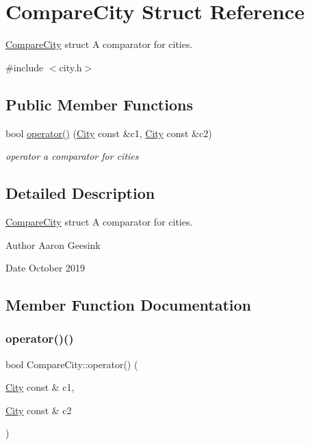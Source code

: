 \hypertarget{struct_compare_city}{}\section{Compare\+City Struct Reference}
\label{struct_compare_city}


\mbox{\hyperlink{struct_compare_city}{Compare\+City}} struct A comparator for cities.  




{\ttfamily \#include $<$city.\+h$>$}

\subsection*{Public Member Functions}
\begin{DoxyCompactItemize}
\item 
bool \mbox{\hyperlink{struct_compare_city_a08fbbcc6710ad653fdee21de31576d10}{operator()}} (\mbox{\hyperlink{class_city}{City}} const \&c1, \mbox{\hyperlink{class_city}{City}} const \&c2)
\begin{DoxyCompactList}\small\item\em operator a comparator for cities \end{DoxyCompactList}\end{DoxyCompactItemize}


\subsection{Detailed Description}
\mbox{\hyperlink{struct_compare_city}{Compare\+City}} struct A comparator for cities. 

\begin{DoxyAuthor}{Author}
Aaron Geesink 
\end{DoxyAuthor}
\begin{DoxyDate}{Date}
October 2019 
\end{DoxyDate}


\subsection{Member Function Documentation}
\mbox{\label{struct_compare_city_a08fbbcc6710ad653fdee21de31576d10}} 
\subsubsection{\texorpdfstring{operator()()}{operator()()}}
{\footnotesize\ttfamily bool Compare\+City\+::operator() (\begin{DoxyParamCaption}\item[{\mbox{\hyperlink{class_city}{City}} const \&}]{c1,  }\item[{\mbox{\hyperlink{class_city}{City}} const \&}]{c2 }\end{DoxyParamCaption})\hspace{0.3cm}{\ttfamily [inline]}}



